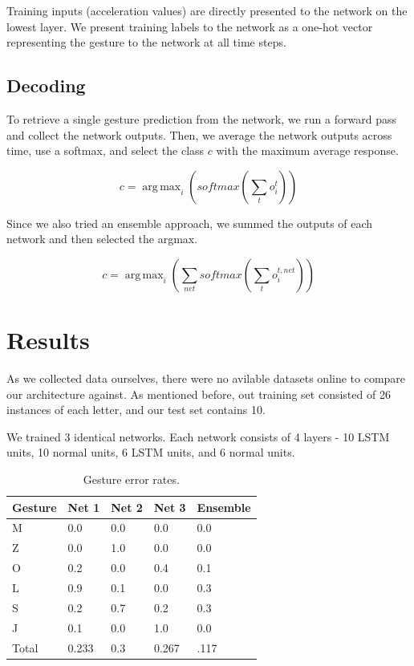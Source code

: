 \documentclass[11pt]{article}
\DeclareMathOperator*{\argmax}{arg\,max}
\begin{document}
Training inputs (acceleration values) are directly presented to
the network on the lowest layer. We present training labels 
to the network as a one-hot vector representing the
gesture to the network at all time steps.

\subsection{Decoding}

To retrieve a single gesture prediction from the network,
we run a forward pass and collect the network outputs. 
Then, we average the network outputs across time, use a softmax,
and select the class \(c\) with the maximum average response.

\[ c = \argmax_{i}(softmax(\sum_{t} o_{i}^{t})) \]

Since we also tried an ensemble approach, we summed the outputs
of each network and then selected the argmax. 

\[ c = \argmax_{i}(\sum_{net} softmax(\sum_{t} o_{i}^{t,net})) \]

\section{Results}

As we collected data ourselves, there were no avilable datasets
online to compare our architecture against. As mentioned before, 
out training set consisted of 26 instances of each letter, and
our test set contains 10.

We trained 3 identical networks. Each network consists of 4 layers -
10 LSTM units, 10 normal units, 6 LSTM units, and 6 normal units.

\begin{table}[h]
\begin{center}
\begin{tabular}{|l|l|l|l|l|}
\hline \bf Gesture & Net 1 & Net 2 & Net 3 & Ensemble \bf \\ 
\hline
M & 0.0 & 0.0 & 0.0 & 0.0 \\
Z & 0.0 & 1.0 & 0.0 & 0.0 \\
O & 0.2 & 0.0 & 0.4 & 0.1 \\
L & 0.9 & 0.1 & 0.0 & 0.3 \\
S & 0.2 & 0.7 & 0.2 & 0.3 \\
J & 0.1 & 0.0 & 1.0 & 0.0 \\
\hline
Total & 0.233 & 0.3 & 0.267 &.117\\
\hline
\end{tabular}
\end{center}
\caption{\label{font-table} Gesture error rates.}
\end{table}
\end{document}
